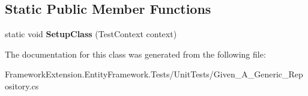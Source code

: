 \subsection*{Static Public Member Functions}
\begin{DoxyCompactItemize}
\item 
\hypertarget{class_framework_extension_1_1_entity_framework_1_1_tests_1_1_unit_tests_1_1_given___a___generic___repository_ac6db1e47fe3a0226be21393b8b5a69fe}{static void {\bfseries Setup\-Class} (Test\-Context context)}\label{class_framework_extension_1_1_entity_framework_1_1_tests_1_1_unit_tests_1_1_given___a___generic___repository_ac6db1e47fe3a0226be21393b8b5a69fe}

\end{DoxyCompactItemize}


The documentation for this class was generated from the following file\-:\begin{DoxyCompactItemize}
\item 
Framework\-Extension.\-Entity\-Framework.\-Tests/\-Unit\-Tests/Given\-\_\-\-A\-\_\-\-Generic\-\_\-\-Repository.\-cs\end{DoxyCompactItemize}
